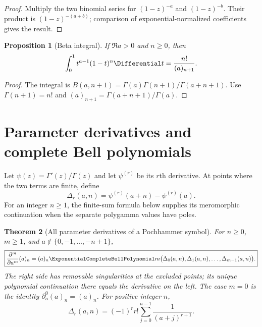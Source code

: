 \documentclass[11pt,a4paper,oneside,openany]{book}
\newtheorem{theorem}{Theorem}[chapter]
\newtheorem{proposition}[theorem]{Proposition}
\theoremstyle{definition}
\theoremstyle{remark}
\begin{document}
\begin{proof}
Multiply the two binomial series for $(1-z)^{-a}$ and $(1-z)^{-b}$.
Their product is $(1-z)^{-(a+b)}$; comparison of exponential-normalized
coefficients gives the result.
\end{proof}

\begin{proposition}[Beta integral]\label{prop:new-pochhammer-beta}
If $\Re a>0$ and $n\ge0$, then
\begin{equation}\label{eq:new-pochhammer-beta}
 \int_0^1t^{a-1}(1-t)^n\Differential t
 =\frac{n!}{(a)_{n+1}}.
\end{equation}
\end{proposition}

\begin{proof}
The integral is $B(a,n+1)=\Gamma(a)\Gamma(n+1)/\Gamma(a+n+1)$.
Use $\Gamma(n+1)=n!$ and
$(a)_{n+1}=\Gamma(a+n+1)/\Gamma(a)$.
\end{proof}

\section{Parameter derivatives and complete Bell polynomials}

Let $\psi(z)=\Gamma'(z)/\Gamma(z)$ and let $\psi^{(r)}$ be its $r$th
derivative.  At points where the two terms are finite, define
\begin{equation}\label{eq:new-delta-polygamma}
 \Delta_r(a,n)=\psi^{(r)}(a+n)-\psi^{(r)}(a).
\end{equation}
For an integer $n\ge1$, the finite-sum formula below supplies its meromorphic
continuation when the separate polygamma values have poles.

\begin{theorem}[All parameter derivatives of a Pochhammer symbol]
\label{thm:new-pochhammer-parameter-derivatives}
For $n\ge0$, $m\ge1$, and
$a\notin\{0,-1,\ldots,-n+1\}$,
\begin{equation}\label{eq:new-pochhammer-parameter-derivatives}
 \boxed{\displaystyle
 \frac{\partial^m}{\partial a^m}(a)_n
 =(a)_n\ExponentialCompleteBellPolynomial m
 \bigl(\Delta_0(a,n),\Delta_1(a,n),\ldots,
       \Delta_{m-1}(a,n)\bigr).}
\end{equation}
The right side has removable singularities at the excluded points; its unique
polynomial continuation there equals the derivative on the left.  The case
$m=0$ is the identity $\partial_a^0(a)_n=(a)_n$.  For positive integer $n$,
\begin{equation}\label{eq:new-delta-polygamma-finite}
 \Delta_r(a,n)=(-1)^r r!\sum_{j=0}^{n-1}\frac1{(a+j)^{r+1}}.
\end{equation}
\end{theorem}
\end{document}
